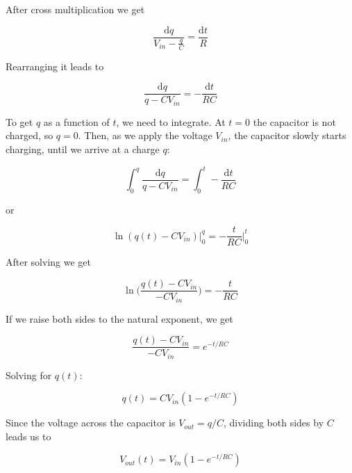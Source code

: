 After cross multiplication we get

\begin{equation}
\label{eq:loop4}
        \frac{\mathrm{d}q}{V_{in}-\displaystyle{\frac{q}{C}}} = \frac{\mathrm{d}t}{R}
\end{equation}

Rearranging it leads to

\begin{equation}
\label{eq:loop5}
        \frac{\mathrm{d}q}{q - CV_{in}} = - \frac{\mathrm{d}t}{RC}
\end{equation}

To get $q$ as a function of $t$, we need to integrate.
At $t = 0$ the capacitor is not charged, so $q = 0$.
Then, as we apply the voltage $V_{in}$, the capacitor slowly starts charging, until we arrive at a charge $q$:

\begin{equation}
\label{eq:loop6}
        \int_{0}^{q} \frac{\mathrm{d}q}{q - CV_{in}} = \int_{0}^{t} - \frac{\mathrm{d}t}{RC}
\end{equation}

or

\begin{equation}
\label{eq:loop7}
        \ln(q(t) - CV_{in})\Bigr|_{0}^{q} = - \frac{t}{RC}\Bigr|_{0}^{t}
\end{equation}

After solving we get

\begin{equation}
\label{eq:loop8}
        \ln\bigg(\frac{q(t) - CV_{in}}{-CV_{in}}\bigg) = - \frac{t}{RC}
\end{equation}

If we raise both sides to the natural exponent, we get

\begin{equation}
\label{eq:loop9}
        \frac{q(t) - CV_{in}}{-CV_{in}} = e^{-t/RC}
\end{equation}

Solving for $q(t)$:

\begin{equation}
\label{eq:loop10}
        q(t) = CV_{in}(1 - e^{-t/RC})
\end{equation}

Since the voltage across the capacitor is $V_{out} = q / C$, dividing both sides by $C$ leads us to

\begin{equation}
\label{eq:loop11}
        V_{out}(t) = V_{in}(1 - e^{-t/RC})
\end{equation}

